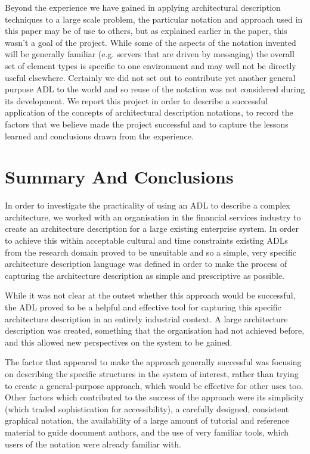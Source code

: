   Beyond the experience we have gained in applying architectural description techniques to a large scale problem, the particular notation and approach used in this paper may be of use to others, but as explained earlier in the paper, this wasn't a goal of the project. While some of the aspects of the notation invented will be generally familiar (e.g. servers that are driven by messaging) the overall set of element types is specific to one environment and may well not be directly useful elsewhere.  Certainly we did not set out to contribute yet another general purpose ADL to the world and so reuse of the notation was not considered during its development.  We report this project in order to describe a successful application of the concepts of architectural description notations, to record the factors that we believe made the project successful and to capture the lessons learned and conclusions drawn from the experience.

\section{Summary And Conclusions}

  In order to investigate the practicality of using an ADL to describe a complex architecture, we worked with an organisation in the financial services industry  to create an architecture description for a large existing enterprise system.  In order to achieve this within acceptable cultural and time constraints existing ADLs from the research domain proved to be unsuitable and so a simple, very specific architecture description language was defined in order to make the process of capturing the architecture description as simple and prescriptive as possible.

  While it was not clear at the outset whether this approach would be successful, the ADL proved to be a helpful and effective tool for capturing this specific architecture description in an entirely industrial context.  A large architecture description was created, something that the organisation had not achieved before, and this allowed new perspectives on the system to be gained.

  The factor that appeared to make the approach generally successful was focusing on describing the specific structures in the system of interest, rather than trying to create a general-purpose approach, which would be effective for other uses too.  Other factors which contributed to the success of the approach were its simplicity (which traded sophistication for accessibility), a carefully designed, consistent graphical notation, the availability of a large amount of tutorial and reference material to guide document authors, and the use of very familiar tools, which users of the notation were already familiar with.

